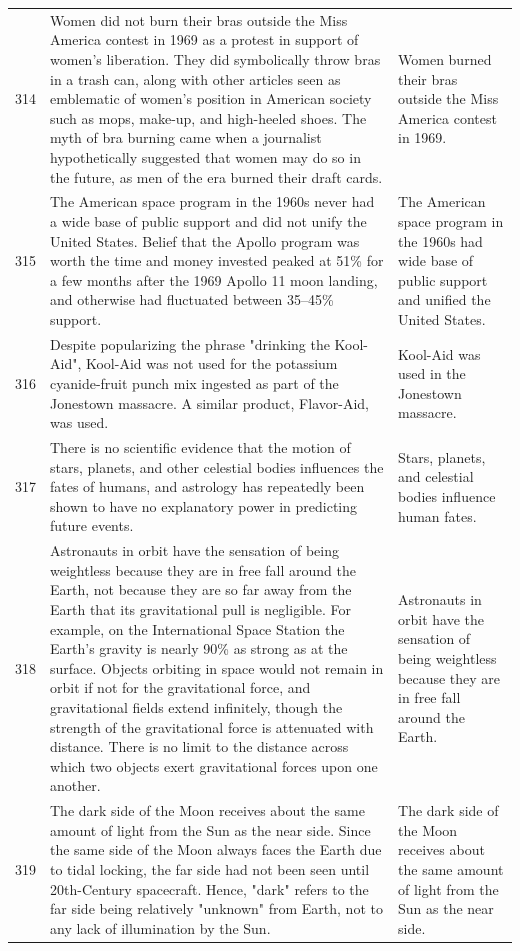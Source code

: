 \begin{tabular}{c|p{}|p{}}
314 & Women did not burn their bras outside the Miss America contest in 1969 as a protest in support of women's liberation. They did symbolically throw bras in a trash can, along with other articles seen as emblematic of women's position in American society such as mops, make-up, and high-heeled shoes. The myth of bra burning came when a journalist hypothetically suggested that women may do so in the future, as men of the era burned their draft cards. & Women burned their bras outside the Miss America contest in 1969. \\
315 & The American space program in the 1960s never had a wide base of public support and did not unify the United States. Belief that the Apollo program was worth the time and money invested peaked at 51\% for a few months after the 1969 Apollo 11 moon landing, and otherwise had fluctuated between 35–45\% support. & The American space program in the 1960s had wide base of public support and unified the United States. \\
316 & Despite popularizing the phrase "drinking the Kool-Aid", Kool-Aid was not used for the potassium cyanide-fruit punch mix ingested as part of the Jonestown massacre. A similar product, Flavor-Aid, was used. & Kool-Aid was used in the Jonestown massacre. \\
317 & There is no scientific evidence that the motion of stars, planets, and other celestial bodies influences the fates of humans, and astrology has repeatedly been shown to have no explanatory power in predicting future events. & Stars, planets, and celestial bodies influence human fates. \\
318 & Astronauts in orbit have the sensation of being weightless because they are in free fall around the Earth, not because they are so far away from the Earth that its gravitational pull is negligible. For example, on the International Space Station the Earth's gravity is nearly 90\% as strong as at the surface. Objects orbiting in space would not remain in orbit if not for the gravitational force, and gravitational fields extend infinitely, though the strength of the gravitational force is attenuated with distance. There is no limit to the distance across which two objects exert gravitational forces upon one another. & Astronauts in orbit have the sensation of being weightless because they are in free fall around the Earth. \\
319 & The dark side of the Moon receives about the same amount of light from the Sun as the near side. Since the same side of the Moon always faces the Earth due to tidal locking, the far side had not been seen until 20th-Century spacecraft. Hence, "dark" refers to the far side being relatively "unknown" from Earth, not to any lack of illumination by the Sun. & The dark side of the Moon receives about the same amount of light from the Sun as the near side. \\

\end{tabular}
